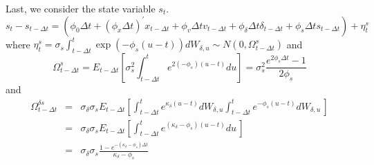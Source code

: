 \documentclass{article}
\begin{document}
Last, we consider the state variable $s_{t}$.%
\begin{equation*}
s_{t}-s_{t-\Delta t}=\left( \phi _{0}\Delta t+\left( \phi _{x}\Delta
t\right) ^{\prime }x_{t-\Delta t}+\phi _{v}\Delta tv_{t-\Delta t}+\phi
_{\delta }\Delta t\delta _{t-\Delta t}+\phi _{s}\Delta ts_{t-\Delta
t}\right) +\eta _{t}^{s}
\end{equation*}%
where $\eta _{t}^{s}=\sigma _{s}\int_{t-\Delta t}^{t}\exp \left( -\phi
_{s}\left( u-t\right) \right) dW_{\delta ,u}\sim N\left( 0,\Omega _{t-\Delta
t}^{s}\right) $ and%
\begin{equation*}
\Omega _{t-\Delta t}^{s}=E_{t-\Delta t}\left[ \sigma _{s}^{2}\int_{t-\Delta
t}^{t}e^{2\left( -\phi _{s}\right) \left( u-t\right) }du\right] =\sigma
_{s}^{2}\frac{e^{2\phi _{s}\Delta t}-1}{2\phi _{s}}
\end{equation*}%
and%
\begin{eqnarray*}
\Omega _{t-\Delta t}^{\delta s} &=&\sigma _{\delta }\sigma _{s}E_{t-\Delta
t} \left[ \int_{t-\Delta t}^{t}e^{\kappa _{\delta }\left( u-t\right)
}dW_{\delta ,u}\int_{t-\Delta t}^{t}e^{-\phi _{s}\left( u-t\right)
}dW_{\delta ,u}\,\right] \\
&=&\sigma _{\delta }\sigma _{s}E_{t-\Delta t}\left[ \int_{t-\Delta
t}^{t}e^{\left( \kappa _{\delta }-\phi _{s}\right) \left( u-t\right) }du\,%
\right] \\
&=&\sigma _{\delta }\sigma _{s}\frac{1-e^{-\left( \kappa _{\delta }-\phi
_{s}\right) \Delta t}}{\kappa _{\delta }-\phi _{s}}
\end{eqnarray*}
\end{document}
